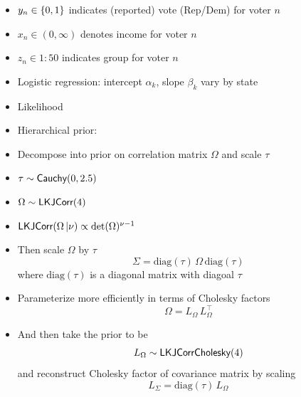 \documentclass[10pt]{report}
\begin{document}
\begin{itemize}
\item $y_n \in \{ 0,1 \}$ indicates (reported) vote
  (Rep/Dem) for voter $n$
\item $x_n \in (0,\infty)$ denotes income for voter $n$
\item $z_n \in 1{:}50$ indicates group for voter $n$
\item Logistic regression: intercept $\alpha_k$, slope $\beta_k$ vary by state
\item Likelihood
\item Hierarchical prior:
\end{itemize}

\begin{itemize}
\item Decompose into prior on correlation matrix $\Omega$ and scale $\tau$
\item $\tau \sim \text{\sf Cauchy}(0, 2.5)$
\item $\Omega \sim \text{\sf LKJCorr}(4)$
\item $\text{\sf LKJCorr}(\Omega \, | \nu) \propto
  \mbox{det}(\Omega)^{\nu - 1}$
\item Then scale $\Omega$ by $\tau$ 
\[
\Sigma = \mbox{diag}(\tau) \, \Omega \, \mbox{diag}(\tau)
\]
where $\mbox{diag}(\tau)$ is a diagonal matrix with diagoal $\tau$
\end{itemize}

\begin{itemize}
\item Parameterize more efficiently in terms of Cholesky factors
\[
\Omega = L_{\Omega} \, L_{\Omega}^{\top}
\]
\item And then take the prior to be 
\[
L_{\Omega} \sim \text{\sf LKJCorrCholesky}(4)
\]
and reconstruct Cholesky factor of covariance matrix by scaling
\[
L_{\Sigma} = \mbox{diag}(\tau) \, L_{\Omega}
\]
\end{itemize}
\end{document}
